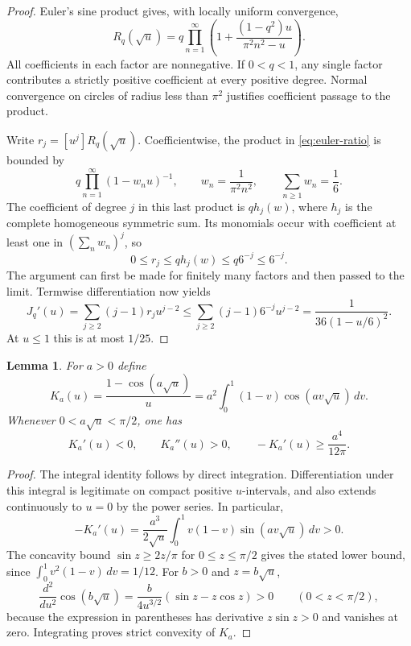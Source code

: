 \documentclass[11pt,a4paper]{article}
\numberwithin{equation}{section}
\newtheorem{lemma}[theorem]{Lemma}
\theoremstyle{remark}
\begin{document}
\begin{proof}
Euler's sine product gives, with locally uniform convergence,
\begin{equation}\label{eq:euler-ratio}
 R_q(\sqrt u)
 =q\prod_{n=1}^{\infty}
  \left(1+\frac{(1-q^2)u}{\pi^2n^2-u}\right).
\end{equation}
All coefficients in each factor are nonnegative. If $0<q<1$,
any single factor contributes a strictly positive coefficient at
every positive degree. Normal convergence on circles of radius
less than $\pi^2$ justifies coefficient passage to the product.

Write $r_j=[u^j]R_q(\sqrt u)$. Coefficientwise, the product
in \eqref{eq:euler-ratio} is bounded by
\[
 q\prod_{n=1}^{\infty}(1-w_nu)^{-1},
 \qquad w_n=\frac1{\pi^2n^2},\qquad \sum_{n\ge1}w_n=\frac16.
\]
The coefficient of degree $j$ in this last product is $q h_j(w)$,
where $h_j$ is the complete homogeneous symmetric sum. Its monomials
occur with coefficient at least one in $(\sum_nw_n)^j$, so
\[
 0\le r_j\le qh_j(w)\le q6^{-j}\le6^{-j}.
\]
The argument can first be made for finitely many factors and then
passed to the limit. Termwise differentiation now yields
\[
 J_q'(u)=\sum_{j\ge2}(j-1)r_j u^{j-2}
 \le\sum_{j\ge2}(j-1)6^{-j}u^{j-2}
 =\frac{1}{36(1-u/6)^2}.
\]
At $u\le1$ this is at most $1/25$.
\end{proof}

\begin{lemma}\label{lem:K}
For $a>0$ define
\[
 K_a(u)=\frac{1-\cos(a\sqrt u)}{u}
       =a^2\int_0^1(1-v)\cos(av\sqrt u)\,dv.
\]
Whenever $0<a\sqrt u<\pi/2$, one has
\[
 K_a'(u)<0,\qquad K_a''(u)>0,\qquad
 -K_a'(u)\ge\frac{a^4}{12\pi}.
\]
\end{lemma}

\begin{proof}
The integral identity follows by direct integration. Differentiation
under this integral is legitimate on compact positive $u$-intervals,
and also extends continuously to $u=0$ by the power series. In
particular,
\[
 -K_a'(u)=\frac{a^3}{2\sqrt u}
  \int_0^1v(1-v)\sin(av\sqrt u)\,dv>0.
\]
The concavity bound $\sin z\ge2z/\pi$ for $0\le z\le\pi/2$
gives the stated lower bound, since
$\int_0^1v^2(1-v)\,dv=1/12$.
For $b>0$ and $z=b\sqrt u$,
\[
 \frac{d^2}{du^2}\cos(b\sqrt u)
 =\frac{b}{4u^{3/2}}(\sin z-z\cos z)>0
 \qquad(0<z<\pi/2),
\]
because the expression in parentheses has derivative $z\sin z>0$
and vanishes at zero. Integrating proves strict convexity of $K_a$.
\end{proof}
\end{document}
